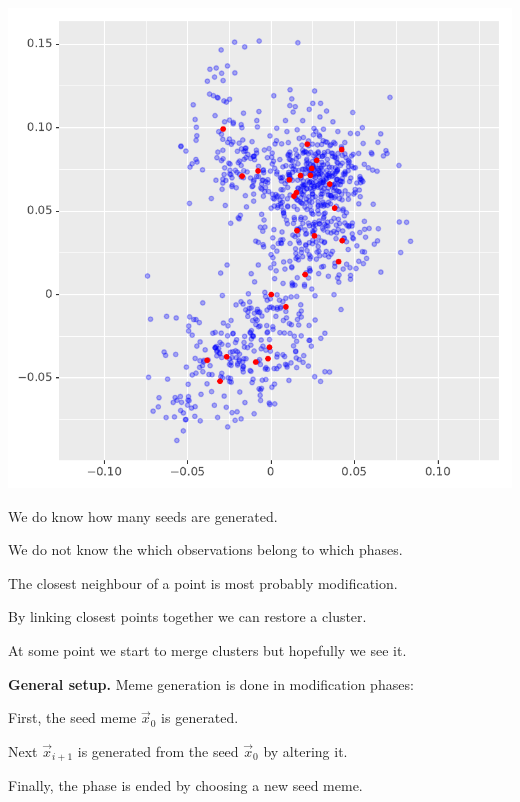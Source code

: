 \documentclass[landscape,footrule]{foils}
\begin{document}
{\includegraphics[scale=0.55]{meme_generation_iv}}

\begin{triangles}
\item We do know how many seeds are generated.
\item We do not know the which observations belong to which phases.
\item The closest neighbour of a point is most probably modification.
\item By linking closest points together we can restore a cluster.
\item At some point we start to merge clusters but hopefully we see it.
\end{triangles}



\textbf{General setup.} Meme generation is done in modification phases:
\begin{triangles}
\item First, the seed meme $\vec{x}_0$ is generated.
\item Next $\vec{x}_{i+1}$ is generated from the seed $\vec{x}_0$ by altering it.
\item Finally, the phase is ended by choosing a new seed meme. \vspace*{2ex}
\end{triangles} 
\end{document}
